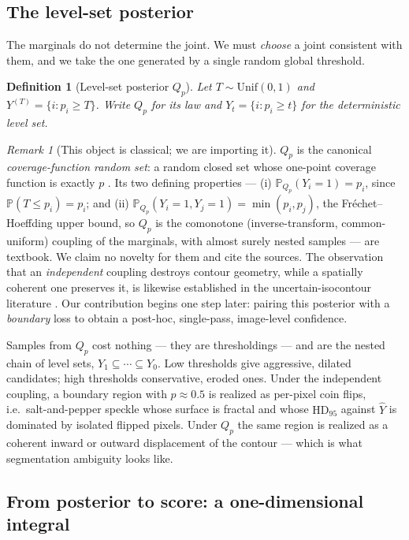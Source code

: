 \documentclass[11pt]{article}
\newtheorem{definition}{Definition}
\theoremstyle{remark}
\newtheorem{remark}{Remark}
\newcommand{\Yhat}{\widehat{Y}}
\newcommand{\HDF}{\mathrm{HD}_{95}}
\newcommand{\Prb}{\mathbb{P}}
\begin{document}
\subsection{The level-set posterior}\label{sec:posterior}

The marginals do not determine the joint. We must \emph{choose} a joint consistent
with them, and we take the one generated by a single random global threshold.

\begin{definition}[Level-set posterior $Q_p$]\label{def:levelset}
Let $T\sim\mathrm{Unif}(0,1)$ and $Y^{(T)} = \{i : p_i \ge T\}$. Write $Q_p$ for its
law and $Y_t = \{i : p_i\ge t\}$ for the deterministic level set.
\end{definition}

\begin{remark}[This object is classical; we are importing it]\label{rem:classical}
$Q_p$ is the canonical \emph{coverage-function random set}: a random closed set
whose one-point coverage function is exactly $p$ \cite{goodman,molchanov}. Its two
defining properties --- (i) $\Prb_{Q_p}(Y_i=1)=p_i$, since $\Prb(T\le p_i)=p_i$;
and (ii) $\Prb_{Q_p}(Y_i=1,Y_j=1)=\min(p_i,p_j)$, the Fr\'echet--Hoeffding upper
bound, so $Q_p$ is the comonotone (inverse-transform, common-uniform) coupling of
the marginals, with almost surely nested samples --- are textbook. We claim no
novelty for them and cite the sources. The observation that an \emph{independent}
coupling destroys contour geometry, while a spatially coherent one preserves it, is
likewise established in the uncertain-isocontour literature
\cite{poethkow,bolin}. Our contribution begins one step later: pairing this
posterior with a \emph{boundary} loss to obtain a post-hoc, single-pass,
image-level confidence.
\end{remark}

Samples from $Q_p$ cost nothing --- they are thresholdings --- and are the nested
chain of level sets, $Y_1\subseteq\cdots\subseteq Y_0$. Low thresholds give
aggressive, dilated candidates; high thresholds conservative, eroded ones. Under
the independent coupling, a boundary region with $p\approx 0.5$ is realized as
per-pixel coin flips, i.e.\ salt-and-pepper speckle whose surface is fractal and
whose $\HDF$ against $\Yhat$ is dominated by isolated flipped pixels. Under $Q_p$
the same region is realized as a coherent inward or outward displacement of the
contour --- which is what segmentation ambiguity looks like.

\subsection{From posterior to score: a one-dimensional integral}
\end{document}
